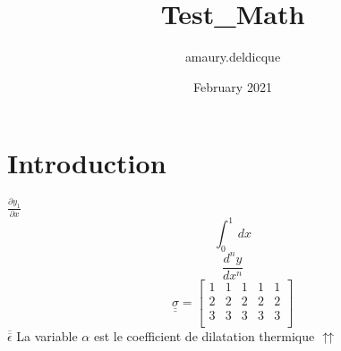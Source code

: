 \documentclass{article}
\title{Test_Math}
\author{amaury.deldicque }
\date{February 2021}
\def\doubleunderline#1{\underline{\underline{#1}}}
\def\doubleoverline#1{\overline{\overline{#1}}}
\begin{document}
\section{Introduction}

$\frac{\partial y_1}{\partial x}$
$$\int_{0}^{1}  \,dx $$
$$\frac{d^n y}{d x^n}$$
$$ \doubleunderline{\sigma} = \left[\begin{array}{ccccc}
     1&1&1&1&1   \\
     2&2&2&2&2   \\
        3&3&3&3&3 \\
        \end{array}\right]$$
$\doubleoverline{\epsilon}$
La variable $\alpha$ est le coefficient de dilatation thermique
$\upuparrows$
\end{document}
